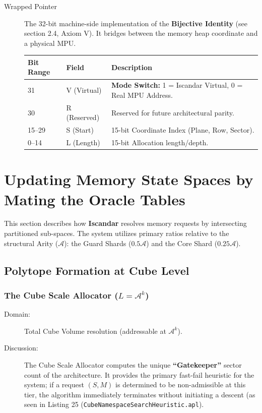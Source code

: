 \documentclass[11pt]{article}
\begin{document}
\begin{description}
    \item[Wrapped Pointer]
The 32-bit machine-side implementation of the \textbf{Bijective Identity} (see section 2.4, Axiom V). It bridges between the memory heap coordinate and a physical MPU.

\begin{table}[h]
\centering
\begin{tabular}{|l|l|l|}
\hline
\textbf{Bit Range} & \textbf{Field} & \textbf{Description} \\ \hline
31          & V (Virtual)   & \textbf{Mode Switch:} 1 = Iscandar Virtual, 0 = Real MPU Address. \\ \hline
30          & R (Reserved)  & Reserved for future architectural parity. \\ \hline
15--29      & S (Start)     & 15-bit Coordinate Index (Plane, Row, Sector). \\ \hline
0--14       & L (Length)    & 15-bit Allocation length/depth. \\ \hline
\end{tabular}
\end{table}
\end{description}



\section{Updating Memory State Spaces by Mating the Oracle Tables}

This section describes how \textbf{Iscandar} resolves memory requests by intersecting partitioned sub-spaces. The system utilizes primary ratios relative to the structural Arity ($\mathcal{A}$): the Guard Shards ($0.5\mathcal{A}$) and the Core Shard ($0.25\mathcal{A}$).

\subsection{Polytope Formation at Cube Level}

\subsubsection{The Cube Scale Allocator ($L = \mathcal{A}^k$)}

\begin{description}
    \item[Domain:] Total Cube Volume resolution (addressable at $\mathcal{A}^k$).
    
    \item[Discussion:] The Cube Scale Allocator computes the unique  \textbf{``Gatekeeper''} sector count of the architecture. It provides the primary fast-fail heuristic for the system; if a request $(S, M)$ is determined to be non-admissible at this tier, the algorithm immediately terminates without initiating a descent (as seen in Listing 25 (\texttt{CubeNamespaceSearchHeuristic.apl}).
\end{description}
\end{document}

